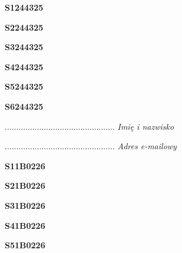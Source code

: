 \begin{turn}{90}\huge \textbf{S1244325}\end{turn}

\begin{turn}{90}\huge \textbf{S2244325}\end{turn}

\begin{turn}{90}\huge \textbf{S3244325}\end{turn}

\begin{turn}{90}\huge \textbf{S4244325}\end{turn}

\begin{turn}{90}\huge \textbf{S5244325}\end{turn}

\begin{turn}{90}\huge \textbf{S6244325}\end{turn}

\begin{turn}{90}\begin{minipage}{\linewidth} \vspace{20mm} ................................................  \textit{Imię i nazwisko}\end{minipage}\end{turn}

\begin{turn}{90}\begin{minipage}{\linewidth} \vspace{20mm} ................................................  \textit{Adres e-mailowy}\end{minipage}\end{turn}

\begin{turn}{90}\huge \textbf{S11B0226}\end{turn}

\begin{turn}{90}\huge \textbf{S21B0226}\end{turn}

\begin{turn}{90}\huge \textbf{S31B0226}\end{turn}

\begin{turn}{90}\huge \textbf{S41B0226}\end{turn}

\begin{turn}{90}\huge \textbf{S51B0226}\end{turn}

